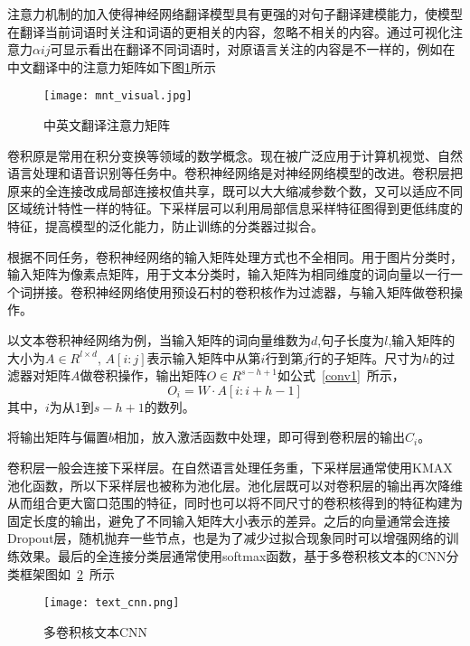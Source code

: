 注意力机制的加入使得神经网络翻译模型具有更强的对句子翻译建模能力，使模型在翻译当前词语时关注和词语的更相关的内容，忽略不相关的内容。通过可视化注意力$\alpha{ij}$可显示看出在翻译不同词语时，对原语言关注的内容是不一样的，例如在中文翻译中的注意力矩阵如下图\ref{english2china}所示
\begin{figure}[htbp]
	\centering
	\texttt{[image: mnt\_visual.jpg]}
	\caption[english2china1]{中英文翻译注意力矩阵}
	\label{english2china}
\end{figure}


卷积原是常用在积分变换等领域的数学概念。现在被广泛应用于计算机视觉、自然语言处理和语音识别等任务中。卷积神经网络是对神经网络模型的改进。卷积层把原来的全连接改成局部连接权值共享，既可以大大缩减参数个数，又可以适应不同区域统计特性一样的特征。下采样层可以利用局部信息采样特征图得到更低纬度的特征，提高模型的泛化能力，防止训练的分类器过拟合。

根据不同任务，卷积神经网络的输入矩阵处理方式也不全相同。用于图片分类时，输入矩阵为像素点矩阵，用于文本分类时，输入矩阵为相同维度的词向量以一行一个词拼接。卷积神经网络使用预设石村的卷积核作为过滤器，与输入矩阵做卷积操作。

以文本卷积神经网络为例，当输入矩阵的词向量维数为$d$,句子长度为$l$,输入矩阵的大小为$A\in R^{l\times d}$, $A[i:j]$表示输入矩阵中从第$i$行到第$j$行的子矩阵。尺寸为$h$的过滤器对矩阵$A$做卷积操作，输出矩阵$O\in R^{s-h+1}$如公式~\ref{conv1}~所示，
\begin{equation}\label{conv1}
O_i=W\cdot A[i:i+h-1]
\end{equation}
其中，$i$为从1到$s-h+1$的数列。

将输出矩阵与偏置$b$相加，放入激活函数中处理，即可得到卷积层的输出$C_i$。

卷积层一般会连接下采样层。在自然语言处理任务重，下采样层通常使用KMAX池化函数，所以下采样层也被称为池化层。池化层既可以对卷积层的输出再次降维从而组合更大窗口范围的特征，同时也可以将不同尺寸的卷积核得到的特征构建为固定长度的输出，避免了不同输入矩阵大小表示的差异。之后的向量通常会连接Dropout层，随机抛弃一些节点，也是为了减少过拟合现象同时可以增强网络的训练效果。最后的全连接分类层通常使用softmax函数，基于多卷积核文本的CNN分类框架图如~\ref{multiCNN}~所示

\begin{figure}[htbp]
	\centering
	\texttt{[image: text\_cnn.png]}
	\caption{多卷积核文本CNN}
	\label{multiCNN}
\end{figure}

